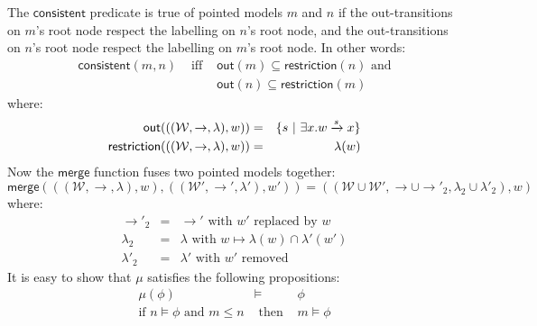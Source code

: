 \noindent The $\mathsf{consistent}$ predicate is true of pointed models $m$ and $n$ if the out-transitions on $m$'s root node respect the labelling on $n$'s root node, and the out-transitions on $n$'s root node respect the labelling on $m$'s root node. In other words:
\begin{eqnarray}
\mathsf{consistent}(m, n) & \mbox{ iff } & \mathsf{out}(m) \subseteq \mathsf{restriction}(n) \mbox{ and} \nonumber \\
& & \mathsf{out}(n) \subseteq \mathsf{restriction}(m) \nonumber
\end{eqnarray}
where:
\begin{eqnarray}
\mathsf{out}(((\mathcal{W},\rightarrow,\lambda),w)) & = & \{ s \ | \  \exists x . w \xrightarrow{s} x \} \nonumber \\
\mathsf{restriction}(((\mathcal{W},\rightarrow,\lambda),w)) & = & \lambda(w) \nonumber
\end{eqnarray}
Now the $\mathsf{merge}$ function fuses two pointed models together:
\[
\mathsf{merge}( ( (\mathcal{W}, \rightarrow, \lambda), w),  ( (\mathcal{W}', \rightarrow', \lambda'), w')) = ((\mathcal{W} \cup \mathcal{W}', \rightarrow \cup \rightarrow'_2, \lambda_2 \cup \lambda'_2), w)
\]
where:
\begin{eqnarray}
\rightarrow'_2 & = & \rightarrow' \mbox{ with } w' \mbox{ replaced by } w \nonumber \\
\lambda_2 & = & \lambda \mbox{ with } w \mapsto \lambda(w) \cap \lambda'(w') \nonumber \\
\lambda'_2 & = & \lambda' \mbox{ with } w' \mbox{ removed } \nonumber
\end{eqnarray}
It is easy to show that $\mu$ satisfies the following propositions:
\begin{eqnarray}
\mu(\phi) & \models & \phi \nonumber \\
\mbox{if }n \models \phi \mbox{ and } m \leq n & \mbox{ then } & m \models \phi \nonumber
\end{eqnarray}

